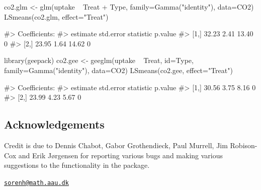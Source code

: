 \begin{Schunk}
\begin{Sinput}
co2.glm <- glm(uptake ~ Treat + Type, family=Gamma("identity"), data=CO2)
LSmeans(co2.glm, effect="Treat")
\end{Sinput}
\begin{Soutput}
#> Coefficients:
#>      estimate std.error statistic p.value
#> [1,]    32.23      2.41     13.40       0
#> [2,]    23.95      1.64     14.62       0
\end{Soutput}
\begin{Sinput}
library(geepack)
co2.gee <- geeglm(uptake ~ Treat, id=Type, family=Gamma("identity"), data=CO2)
LSmeans(co2.gee, effect="Treat")
\end{Sinput}
\begin{Soutput}
#> Coefficients:
#>      estimate std.error statistic p.value
#> [1,]    30.56      3.75      8.16       0
#> [2,]    23.99      4.23      5.67       0
\end{Soutput}
\end{Schunk}

\hypertarget{acknowledgements}{%
\subsection{Acknowledgements}\label{acknowledgements}}

Credit is due to Dennis Chabot, Gabor Grothendieck, Paul Murrell, Jim
Robison-Cox and Erik Jørgensen for reporting various bugs and making
various suggestions to the functionality in the  package.




\address{%
Søren Højsgaard\\
Department of Mathematical Sciences, Aalborg University, Denmark\\
Skjernvej 4A\\ 9220 Aalborg Ø, Denmark\\
}
\href{mailto:sorenh@math.aau.dk}{\nolinkurl{sorenh@math.aau.dk}}


